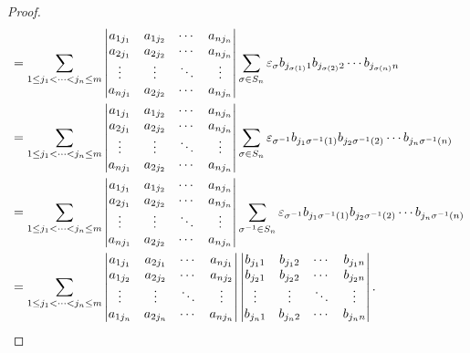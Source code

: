 \documentclass{ctexart}
\begin{document}
\begin{proof}
\begin{align*}
        & =\sum\limits_{1\leq j_1<\cdots<j_n\leq m}\begin{vmatrix}
            a_{1j_1} & a_{1j_2} & \cdots & a_{nj_n} \\
            a_{2j_1} & a_{2j_2} & \cdots & a_{nj_n} \\
            \vdots & \vdots & \ddots & \vdots \\
            a_{nj_1} & a_{2j_2} & \cdots & a_{nj_n} \\
        \end{vmatrix}\sum_{\sigma\in S_n}\varepsilon_\sigma b_{j_{\sigma(1)}1}b_{j_{\sigma(2)}2}\cdots b_{j_{\sigma(n)}n} \\
        & =\sum\limits_{1\leq j_1<\cdots<j_n\leq m}\begin{vmatrix}
            a_{1j_1} & a_{1j_2} & \cdots & a_{nj_n} \\
            a_{2j_1} & a_{2j_2} & \cdots & a_{nj_n} \\
            \vdots & \vdots & \ddots & \vdots \\
            a_{nj_1} & a_{2j_2} & \cdots & a_{nj_n} \\
        \end{vmatrix}\sum_{\sigma\in S_n}\varepsilon_{\sigma^{-1}}b_{j_1\sigma^{-1}(1)}b_{j_2\sigma^{-1}(2)}\cdots b_{j_n\sigma^{-1}(n)} \\
        & =\sum\limits_{1\leq j_1<\cdots<j_n\leq m}\begin{vmatrix}
            a_{1j_1} & a_{1j_2} & \cdots & a_{nj_n} \\
            a_{2j_1} & a_{2j_2} & \cdots & a_{nj_n} \\
            \vdots & \vdots & \ddots & \vdots \\
            a_{nj_1} & a_{2j_2} & \cdots & a_{nj_n} \\
        \end{vmatrix}\sum_{\sigma^{-1}\in S_n}\varepsilon_{\sigma^{-1}}b_{j_1\sigma^{-1}(1)}b_{j_2\sigma^{-1}(2)}\cdots b_{j_n\sigma^{-1}(n)} \\
        & =\sum\limits_{1\leq j_1<\cdots<j_n\leq m}\begin{vmatrix}
            a_{1j_1} & a_{2j_1} & \cdots & a_{nj_1} \\
            a_{1j_2} & a_{2j_2} & \cdots & a_{nj_2} \\
            \vdots & \vdots & \ddots & \vdots \\
            a_{1j_n} & a_{2j_n} & \cdots & a_{nj_n} \\
        \end{vmatrix}\begin{vmatrix}
            b_{j_11} & b_{j_12} & \cdots & b_{j_1n} \\
            b_{j_21} & b_{j_22} & \cdots & b_{j_2n} \\
            \vdots & \vdots & \ddots & \vdots \\
            b_{j_n1} & b_{j_n2} & \cdots & b_{j_nn} \\
        \end{vmatrix}.\qedhere
    \end{align*}
\end{proof}
\end{document}
